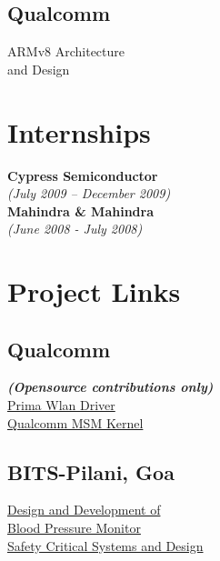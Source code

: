 \documentclass[letterpaper]{deedy-resume} %
\begin{document}
\begin{minipage}[t]{0.25\textwidth}
\subsection{Qualcomm}
\textbullet{} ARMv8 Architecture \\ \hphantom{\textbullet{}} and Design \\
\lsectionspace %
\section{Internships}
\footnotesize \textbf{Cypress Semiconductor} \\
\footnotesize \textit{(July 2009 – December 2009)} \\
\footnotesize \textbf{Mahindra \& Mahindra} \\
\footnotesize \textit{(June 2008 - July 2008)} \\
\lsectionspace %
\section{Project Links}
\subsection{Qualcomm}
\footnotesize \textit{\textbf{(Opensource contributions only)} } \\
\textbullet{} \href{https://www.codeaurora.org/cgit/quic/la/platform/vendor/qcom-opensource/wlan/prima/}{Prima Wlan Driver} \\
\textbullet{} \href{https://www.codeaurora.org/cgit/quic/la/kernel/msm-3.10}{Qualcomm MSM Kernel} \\
\subsection{BITS-Pilani, Goa}
\textbullet{} \href{http://www.scribd.com/doc/248438366/Design-and-Development-of-a-Blood-Pressure-Monitor}{Design and Development of \\ \hphantom{\textbullet{}} Blood Pressure Monitor} \\
\textbullet{} \href{http://www.scribd.com/doc/248440573/Safety-Critical-Systems}{Safety Critical Systems and Design} \\
\lsectionspace %

\end{minipage}
\end{document}
